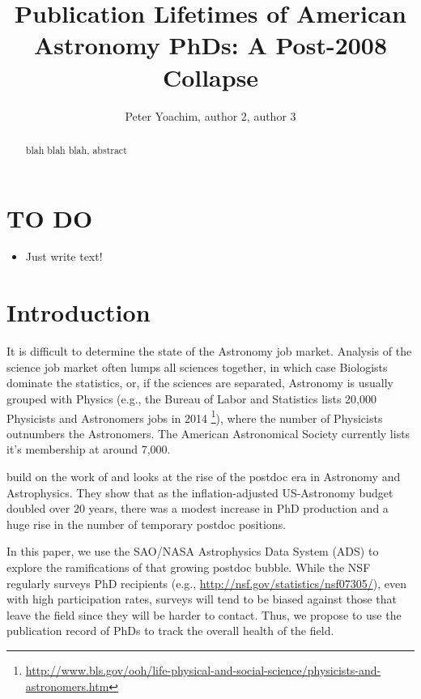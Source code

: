 \documentclass{emulateapj}
\begin{document}
\title{Publication Lifetimes of American Astronomy PhDs: A Post-2008 Collapse}

\author{Peter Yoachim, author 2, author 3 
  }


\begin{abstract}
blah blah blah, abstract

\end{abstract}


\section{TO DO}
\begin{itemize}
\item{Just write text! }
\end{itemize}

\section{Introduction}

It is difficult to determine the state of the Astronomy job market.  Analysis of the science job market often lumps all sciences together, in which case Biologists dominate the statistics, or, if the sciences are separated, Astronomy is usually grouped with Physics (e.g., the Bureau of Labor and Statistics lists 20,000 Physicists and Astronomers jobs in 2014 \footnote{\url{http://www.bls.gov/ooh/life-physical-and-social-science/physicists-and-astronomers.htm}}), where the number of Physicists outnumbers the Astronomers.  The American Astronomical Society currently lists it's membership at around 7,000.

\citet{Seth09} build on the work of \citet{Metcalfe08} and looks at the rise of the postdoc era in Astronomy and Astrophysics.  They show that as the inflation-adjusted US-Astronomy budget doubled over 20 years, there was a modest increase in PhD production and a huge rise in the number of temporary postdoc positions.

In this paper, we use the SAO/NASA Astrophysics Data System (ADS) to explore the ramifications of that growing postdoc bubble.  While the NSF regularly surveys PhD recipients (e.g., \url{http://nsf.gov/statistics/nsf07305/}), even with high participation rates, surveys will tend to be biased against those that leave the field since they will be harder to contact.  Thus, we propose to use the publication record of PhDs to track the overall health of the field.  
\end{document}
